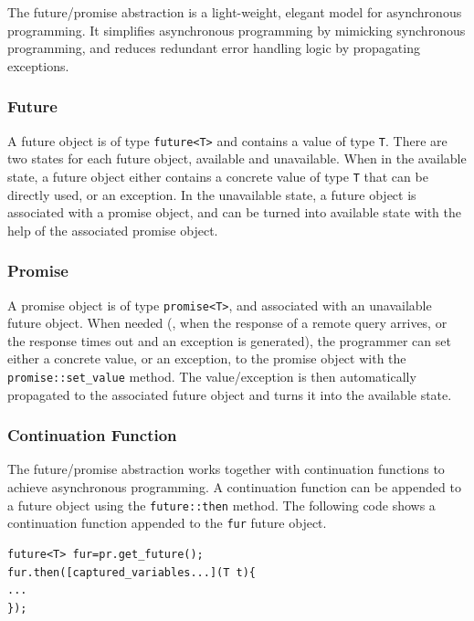 The future/promise abstraction is a light-weight, elegant model for asynchronous programming. It simplifies asynchronous programming by mimicking synchronous programming, and reduces redundant error handling logic by propagating exceptions.


\subsubsection{Future}
A future object is of type \lstinline[style=InlineStyle]{future<T>} and contains a value of type \lstinline[style=InlineStyle]{T}. %
There are two states for each future object, available and unavailable. When in the available state, a future object either contains a concrete value of type \lstinline[style=InlineStyle]{T} that can be directly used, or an exception. In the unavailable state, a future object is associated with a promise object, and can be turned into available state with the help of the associated promise object.

\subsubsection{Promise}
A promise object is of type \lstinline[style=InlineStyle]{promise<T>}, and associated with an unavailable future object. When needed (\eg, when the response of a remote query arrives, or the response times out and an exception is generated), the programmer can set either a concrete value, or an exception, to the promise object with the \lstinline[style=InlineStyle]{promise::set_value} method. The value/exception is then automatically propagated to the associated future object and turns it into the available state.

\subsubsection{Continuation Function}
The future/promise abstraction works together with continuation functions to achieve asynchronous programming. A continuation function can be appended to a future object using the \lstinline[style=InlineStyle]{future::then} method. The following code shows a continuation function appended to the \lstinline[style=InlineStyle]{fur} future object.

\vspace{-1mm}
\begin{lstlisting}[style=InlineStyle]
future<T> fur=pr.get_future();
fur.then([captured_variables...](T t){
...
});
\end{lstlisting}
\vspace{-1mm}

